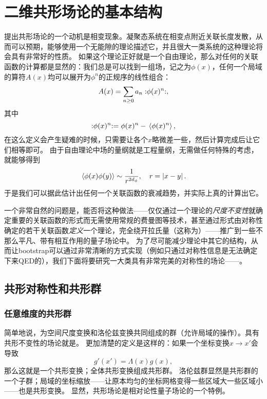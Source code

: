 \chapter{二维共形场论的基本结构}

提出共形场论的一个动机是相变现象。凝聚态系统在相变点附近关联长度发散，从而可以预期，能够使用一个无能隙的理论描述它，并且很大一类系统的这种理论将会具有非常好的性质。
如果这个理论正好就是一个自由理论，那么对任何的关联函数的计算都是显然的：我们总是可以找到一组场，记之为$\phi(x)$，任何一个局域的算符$A(x)$均可以展开为$\phi^n$的正规序的线性组合：
\begin{equation}
    A(x) = \sum_{n \geq 0} a_n \mathrel{\mathop{:}}\mathrel{\phi(x)^n}\mathrel{\mathop{:}},
\end{equation}
其中
\[
    \mathrel{\mathop{:}}\mathrel{\phi(x)^n}\mathrel{\mathop{:}} = \phi(x)^n - \expval*{\phi(x)^n},
\]
在这么定义会产生疑难的时候，只需要让各个$x$略微差一些，然后计算完成后让它们相等即可。
由于自由理论中场的量纲就是工程量纲，无需做任何特殊的考虑，就能够得到
\begin{equation}
    \expval*{\phi(x) \phi(y)} \sim \frac{1}{r^{2 d_\phi}}, \quad r = \abs*{x - y}.
\end{equation}
于是我们可以据此估计出任何一个关联函数的衰减趋势，并实际上真的计算出它。

一个非常自然的问题是，能否将这种做法——仅仅通过一个理论的\emph{尺度不变性}就确定重要的关联函数的形式而无需使用常规的费曼图等技术，甚至通过形式由对称性确定的若干关联函数\emph{定义}一个理论，完全绕开拉氏量（这称为）——推广到一些不那么平凡、带有相互作用的量子场论中。
为了尽可能减少理论中其它的结构，从而让bootstrap可以通过非常清晰的方式实现（例如只通过对称性信息是无法确定下来QED的），我们下面将要研究一大类具有非常完美的对称性的场论——。

\section{共形对称性和共形群}

\subsection{任意维度的共形群}

简单地说，为空间尺度变换和洛伦兹变换共同组成的群（允许局域的操作）。具有共形不变性的场论就是。
更加清楚的定义是这样的：如果一个坐标变换$x \longrightarrow x'$会导致
\begin{equation}
    g'(x') = \Lambda(x) g(x),
    \label{eq:conformal-def}
\end{equation}
那么这就是一个共形变换；全体共形变换组成共形群。
洛伦兹群显然是共形群的一个子群；局域的坐标缩放——让原本均匀的坐标网格变得一些区域大一些区域小——也是共形变换。
显然，共形场论是相对论性量子场论的一个特例。


